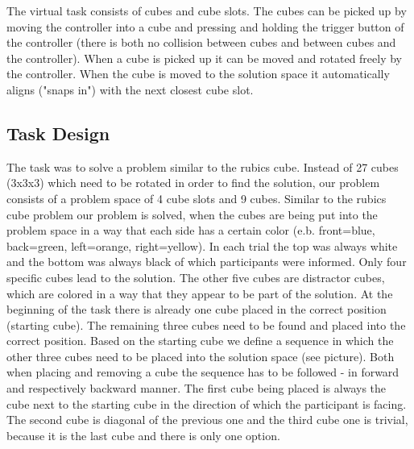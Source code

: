\documentclass{article}
\begin{document}
The virtual task consists of cubes and cube slots. The cubes can be picked up by moving the controller into a cube and pressing and holding the trigger button of the controller (there is both no collision between cubes and between cubes and the controller). When a cube is picked up it can be moved and rotated freely by the controller. When the cube is moved to the solution space it  automatically aligns ("snaps in") with the next closest cube slot.






\subsection{Task Design}
The task was to solve a problem similar to the rubics cube. Instead of 27 cubes (3x3x3) which need to be rotated in order to find the solution, our problem consists of a problem space of 4 cube slots and 9 cubes. Similar to the rubics cube problem our problem is solved, when the cubes are being put into the problem space in a way that each side has a certain color (e.b. front=blue, back=green, left=orange, right=yellow). In each trial the top was always white and the bottom was always black of which participants were informed. Only four specific cubes lead to the solution. The other five cubes are distractor cubes, which are colored in a way that they appear to be part of the solution. At the beginning of the task there is already one cube placed in the correct position (starting cube). The remaining three cubes need to be found and placed into the correct position. Based on the starting cube we define a sequence in which the other three cubes need to be placed into the solution space (see picture). Both when placing and removing a cube the sequence has to be followed - in forward and respectively backward manner. The first cube being placed is always the cube next to the starting cube in the direction of which the participant is facing. The second cube is diagonal of the previous one and the third cube one is trivial, because it is the last cube and there is only one option.
\end{document}
